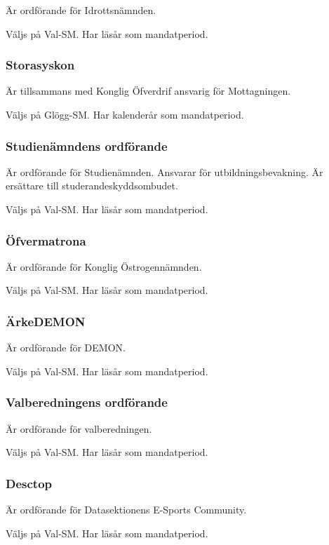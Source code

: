 \documentclass{dgovdoc}
\begin{document}
Är ordförande för Idrottsnämnden.

Väljs på Val-SM. Har läsår som mandatperiod.

\subsubsection{Storasyskon}

Är tillsammans med Konglig Öfverdrif ansvarig för Mottagningen.

Väljs på Glögg-SM. Har kalenderår som mandatperiod.

\subsubsection{Studienämndens ordförande}

Är ordförande för Studienämnden. Ansvarar för utbildningsbevakning. Är
ersättare till studerandeskyddsombudet.

Väljs på Val-SM. Har läsår som mandatperiod.

\subsubsection{Öfvermatrona}

Är ordförande för Konglig Östrogennämnden.

Väljs på Val-SM. Har läsår som mandatperiod.

\subsubsection{ÄrkeDEMON}

Är ordförande för DEMON.

Väljs på Val-SM. Har läsår som mandatperiod.

\subsubsection{Valberedningens ordförande}

Är ordförande för valberedningen.

Väljs på Val-SM. Har läsår som mandatperiod.

\subsubsection{Desctop}

Är ordförande för Datasektionens E-Sports Community.

Väljs på Val-SM. Har läsår som mandatperiod.
\end{document}
